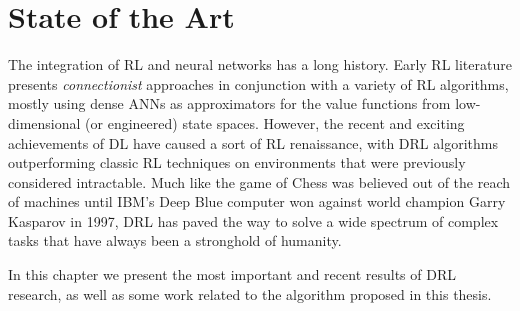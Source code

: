 \chapter{State of the Art}
\label{chapter3_state_of_the_art}
\thispagestyle{empty}

\vspace{0.5cm}

The integration of RL and neural networks has a long history. Early 
RL literature \cite{rummery1994line, tesauro1995temporal, bertsekas1995neuro}
presents \textit{connectionist} approaches in conjunction with a variety
of RL algorithms, mostly using dense ANNs as approximators for the value 
functions from low-dimensional (or engineered) state spaces.
However, the recent and exciting achievements of DL have caused a sort of RL 
renaissance, with DRL algorithms outperforming classic RL techniques on 
environments that were previously considered intractable. 
Much like the game of Chess was believed out of the reach of machines until 
IBM's Deep Blue computer \cite{campbell2002deep} won against world champion 
Garry Kasparov in 1997, DRL has paved the way to solve a wide spectrum of 
complex tasks that have always been a stronghold of humanity. 

In this chapter we present the most important and recent results of DRL research, 
as well as some work related to the algorithm proposed in this thesis.

